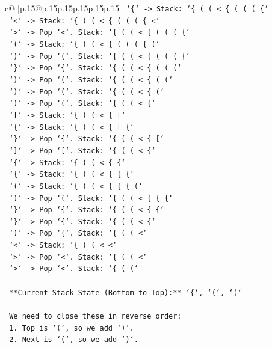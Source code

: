\documentclass{article}
\begin{document}
{\begin{supertabular}{c@{$\;$}|p{.15\linewidth}@{}p{.15\linewidth}p{.15\linewidth}p{.15\linewidth}p{.15\linewidth}p{.15\linewidth}}
{{{\texttt{    `\{` {-}> Stack: `\{ ( ( < \{ ( ( ( \{`} \\
\texttt{    `<` {-}> Stack: `\{ ( ( < \{ ( ( ( \{ <`} \\
\texttt{    `>` {-}> Pop `<`. Stack: `\{ ( ( < \{ ( ( ( \{`} \\
\texttt{    `(` {-}> Stack: `\{ ( ( < \{ ( ( ( \{ (`} \\
\texttt{    `)` {-}> Pop `(`. Stack: `\{ ( ( < \{ ( ( ( \{`} \\
\texttt{    `\}` {-}> Pop `\{`. Stack: `\{ ( ( < \{ ( ( (`} \\
\texttt{    `)` {-}> Pop `(`. Stack: `\{ ( ( < \{ ( (`} \\
\texttt{    `)` {-}> Pop `(`. Stack: `\{ ( ( < \{ (`} \\
\texttt{    `)` {-}> Pop `(`. Stack: `\{ ( ( < \{`} \\
\texttt{    `{[}` {-}> Stack: `\{ ( ( < \{ {[}`} \\
\texttt{    `\{` {-}> Stack: `\{ ( ( < \{ {[} \{`} \\
\texttt{    `\}` {-}> Pop `\{`. Stack: `\{ ( ( < \{ {[}`} \\
\texttt{    `{]}` {-}> Pop `{[}`. Stack: `\{ ( ( < \{`} \\
\texttt{    `\{` {-}> Stack: `\{ ( ( < \{ \{`} \\
\texttt{    `\{` {-}> Stack: `\{ ( ( < \{ \{ \{`} \\
\texttt{    `(` {-}> Stack: `\{ ( ( < \{ \{ \{ (`} \\
\texttt{    `)` {-}> Pop `(`. Stack: `\{ ( ( < \{ \{ \{`} \\
\texttt{    `\}` {-}> Pop `\{`. Stack: `\{ ( ( < \{ \{`} \\
\texttt{    `\}` {-}> Pop `\{`. Stack: `\{ ( ( < \{`} \\
\texttt{    `)` {-}> Pop `\{`. Stack: `\{ ( ( <`} \\
\texttt{    `<` {-}> Stack: `\{ ( ( < <`} \\
\texttt{    `>` {-}> Pop `<`. Stack: `\{ ( ( <`} \\
\texttt{    `>` {-}> Pop `<`. Stack: `\{ ( (`} \\
\\ 
\texttt{    **Current Stack State (Bottom to Top):** `\{`, `(`, `(`} \\
\\ 
\texttt{    We need to close these in reverse order:} \\
\texttt{    1.  Top is `(`, so we add `)`.} \\
\texttt{    2.  Next is `(`, so we add `)`.} \\
}}}
\end{supertabular}}
\end{document}
